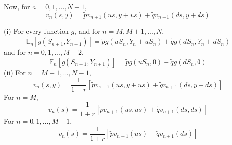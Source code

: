 \documentclass[12pt]{article}
\newenvironment{exercise}[2][Exercise]{\begin{trivlist}
		\item[\hskip \labelsep {\bfseries #1}\hskip \labelsep {\bfseries #2.}]}{\end{trivlist}}
\begin{document}
	Now, for $n=0,1,...,N-1$, 
	$$v_n(s,y) = \tilde{p}v_{n+1}(us,y+us)+\tilde{q}v_{n+1}(ds,y+ds)$$
	\begin{exercise}{14}\end{exercise}
	(i) For every function $g$, and for $n=M,M+1,...,N$, 
	$$\tilde{\mathbb{E}}_n[g(S_{n+1},Y_{n+1})] = \tilde{p}g(uS_n,Y_n+uS_n)+\tilde{q}g(dS_n,Y_n+dS_n)$$
	and for $n=0,1,...,M-2$, 
	$$\tilde{\mathbb{E}}_n[g(S_{n+1},Y_{n+1})] = \tilde{p}g(uS_n,0) + \tilde{q}g(dS_n,0)$$
	(ii) For $n=M+1,...,N-1$, 
	$$v_n(s,y) = \frac{1}{1+r}[\tilde{p}v_{n+1}(us,y+us)+\tilde{q}v_{n+1}(ds,y+ds)]$$
	For $n=M$,
	$$v_n(s) = \frac{1}{1+r}[\tilde{p}v_{n+1}(us,us)+\tilde{q}v_{n+1}(ds,ds)]$$
	For $n=0,1,...,M-1$,
	$$v_n(s) = \frac{1}{1+r}[\tilde{p}v_{n+1}(us)+\tilde{q}v_{n+1}(ds)]$$
 
\end{document}
